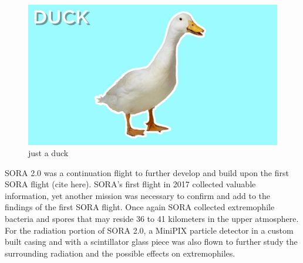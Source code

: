 \begin{figure}[h!]
  \begin{center}
      \includegraphics[width=\textwidth]{./figures/duck.jpg}
      \caption{just a duck}
      \label{fig:duck}
  \end{center}
\end{figure}

SORA 2.0 was a continuation flight to further develop and build upon the first SORA flight (cite here).  SORA's first flight in 2017 collected valuable information, yet another mission was necessary to confirm and add to the findings of the first SORA flight.  Once again SORA collected extremophile bacteria and spores that may reside 36 to 41 kilometers in the upper atmosphere.  For the radiation portion of SORA 2.0, a MiniPIX particle detector in a custom built casing and with a scintillator glass piece was also flown to further study the surrounding radiation and the possible effects on extremophiles.  
 
